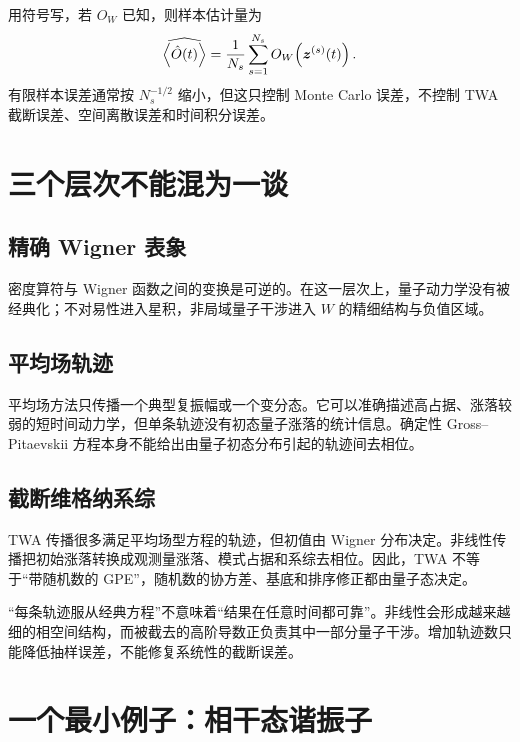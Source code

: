 用符号写，若 $O_W$ 已知，则样本估计量为
\begin{equation}
  \widehat{\left\langle \hat O(t)\right\rangle}
  =\frac{1}{N_s}\sum_{s=1}^{N_s}
  O_W\!\left(\bm z^{(s)}(t)\right).
  \label{eq:monte-carlo-estimator}
\end{equation}
有限样本误差通常按 $N_s^{-1/2}$ 缩小，但这只控制 Monte Carlo 误差，不控制 TWA 截断误差、空间离散误差和时间积分误差。

\section{三个层次不能混为一谈}

\subsection{精确 Wigner 表象}

密度算符与 Wigner 函数之间的变换是可逆的。在这一层次上，量子动力学没有被经典化；不对易性进入星积，非局域量子干涉进入 $W$ 的精细结构与负值区域。

\subsection{平均场轨迹}

平均场方法只传播一个典型复振幅或一个变分态。它可以准确描述高占据、涨落较弱的短时间动力学，但单条轨迹没有初态量子涨落的统计信息。确定性 Gross--Pitaevskii 方程本身不能给出由量子初态分布引起的轨迹间去相位。

\subsection{截断维格纳系综}

TWA 传播很多满足平均场型方程的轨迹，但初值由 Wigner 分布决定。非线性传播把初始涨落转换成观测量涨落、模式占据和系综去相位。因此，TWA 不等于“带随机数的 GPE”，随机数的协方差、基底和排序修正都由量子态决定。

\begin{warningbox}
“每条轨迹服从经典方程”不意味着“结果在任意时间都可靠”。非线性会形成越来越细的相空间结构，而被截去的高阶导数正负责其中一部分量子干涉。增加轨迹数只能降低抽样误差，不能修复系统性的截断误差。
\end{warningbox}

\section{一个最小例子：相干态谐振子}

